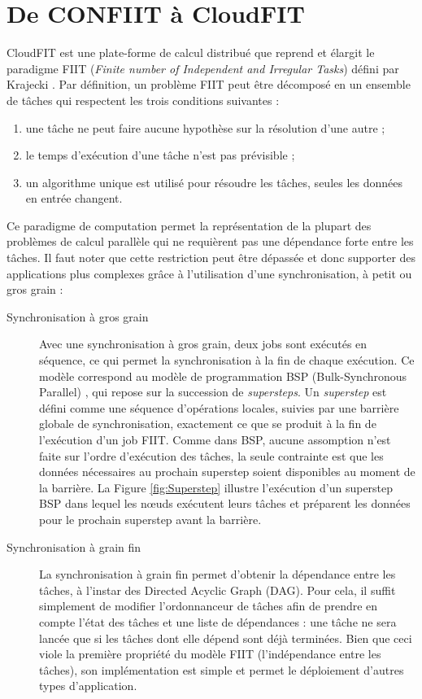 \section{De CONFIIT à CloudFIT}

CloudFIT est une plate-forme de calcul distribué que reprend et élargit le paradigme FIIT (\textit{Finite number of Independent and Irregular Tasks}) défini par Krajecki \cite{Kraj99}. Par définition, un problème FIIT peut être décomposé en un ensemble de tâches qui respectent les trois conditions suivantes :
\begin{enumerate}
	\item une tâche ne peut faire aucune hypothèse sur la résolution d'une autre ;
	\item le temps d'exécution d'une tâche n'est pas prévisible ;
	\item un algorithme unique est utilisé pour résoudre les tâches, seules les données en entrée changent. 
\end{enumerate}

Ce paradigme de computation permet la représentation de la plupart des problèmes de calcul parallèle qui ne requièrent pas une dépendance forte entre les tâches. Il faut noter que cette restriction peut être dépassée et donc supporter des applications plus complexes grâce à l'utilisation d'une synchronisation, à petit ou gros grain :

\begin{description}
\item [Synchronisation à gros grain] Avec une synchronisation à gros grain, deux jobs sont exécutés en séquence, ce qui permet la synchronisation à la fin de chaque exécution. Ce modèle correspond au modèle de programmation BSP (Bulk-Synchronous Parallel) \cite{Valiant90}, qui repose sur la succession de \textit{supersteps}. Un \textit{superstep} est défini comme une séquence d'opérations locales, suivies par une barrière globale de synchronisation, exactement ce que se produit à la fin de l'exécution d'un job FIIT. Comme dans BSP, aucune assomption n'est faite sur l'ordre d'exécution des tâches, la seule contrainte est que les données nécessaires au prochain superstep soient disponibles au moment de la barrière. La Figure \ref{fig:Superstep}  illustre l'exécution d'un superstep BSP dans lequel les n{\oe}uds exécutent leurs tâches et préparent les données pour le prochain superstep avant la barrière.

\item [Synchronisation à grain fin] La synchronisation à grain fin permet d'obtenir la dépendance entre les tâches, à l'instar des Directed Acyclic Graph (DAG). Pour cela, il suffit simplement de modifier l'ordonnanceur de tâches afin de prendre en compte l'état des tâches et une liste de dépendances : une tâche ne sera lancée que si les tâches dont elle dépend sont déjà terminées. Bien que ceci viole la première propriété du modèle FIIT (l'indépendance entre les tâches), son implémentation est simple et permet le déploiement d'autres types d'application.
\end{description}


